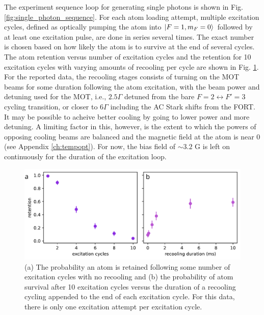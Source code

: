 The experiment sequence loop for generating single photons is shown in Fig. \ref{fig:single_photon_sequence}. For each atom loading attempt, multiple excitation cycles, defined as optically pumping the atom into $\ket{F=1,m_F=0}$ followed by at least one excitation pulse, are done in series several times. The exact number is chosen based on how likely the atom is to survive at the end of several cycles. The atom retention versus number of excitation cycles and the retention for 10 excitation cycles with varying amounts of recooling per cycle are shown in Fig. \ref{fig:sequence_survival_probability}. For the reported data, the recooling stages consists of turning on the MOT beams for some duration following the atom excitation, with the beam power and detuning used for the MOT, i.e., $2.5 \Gamma$ detuned from the bare $F=2\leftrightarrow F'=3$ cycling transition, or closer to $6 \Gamma$ including the AC Stark shifts from the FORT. It may be possible to acheive better cooling by going to lower power and more detuning. A limiting factor in this, however, is the extent to which the powers of opposing cooling beams are balanced and the magnetic field at the atom is near 0 (see Appendix \ref{ch:tempopt}). For now, the bias field of $\sim3.2 $ G is left on continuously for the duration of the excitation loop.

\begin{figure}[!h]
    \centering
    \includegraphics[width=\textwidth]{Images/retention_vs_excitation_cycles_and_recooling.pdf}
    \caption{(a) The probability an atom is retained following some number of excitation cycles with no recooling and (b) the probability of atom survival after 10 excitation cycles versus the duration of a recooling cycling appended to the end of each excitation cycle. For this data, there is only one excitation attempt per excitation cycle.}
    \label{fig:sequence_survival_probability}
\end{figure}

